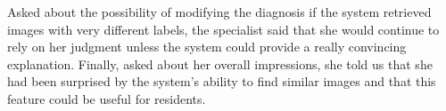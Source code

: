Asked about the possibility of modifying the diagnosis if the system retrieved images with very different labels, the specialist said that she would continue to rely on her judgment unless the system could provide a really convincing explanation. Finally, asked about her overall impressions, she told us that she had been surprised by the system's ability to find similar images and that this feature could be useful for residents.